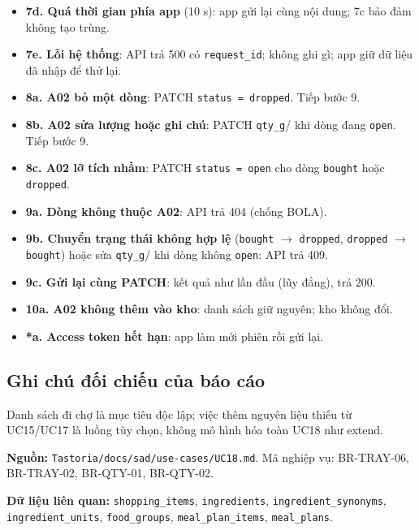 \begin{itemize}
\item \textbf{7d. Quá thời gian phía app} (10 s): app gửi lại cùng nội dung; 7c bảo đảm không tạo trùng.
\item \textbf{7e. Lỗi hệ thống}: API trả 500 có {\small\texttt{request\_\allowbreak{}\allowbreak{}id}}; không ghi gì; app giữ dữ liệu đã nhập để thử lại.
\item \textbf{8a. A02 bỏ một dòng}: PATCH {\small\texttt{status = dropped}}. Tiếp bước 9.
\item \textbf{8b. A02 sửa lượng hoặc ghi chú}: PATCH {\small\texttt{qty\_\allowbreak{}\allowbreak{}g}}/ khi dòng đang {\small\texttt{open}}. Tiếp bước 9.
\item \textbf{8c. A02 lỡ tích nhầm}: PATCH {\small\texttt{status = open}} cho dòng {\small\texttt{bought}} hoặc {\small\texttt{dropped}}.
\item \textbf{9a. Dòng không thuộc A02}: API trả 404 (chống BOLA).
\item \textbf{9b. Chuyển trạng thái không hợp lệ} ({\small\texttt{bought}} \ensuremath{\rightarrow} {\small\texttt{dropped}}, {\small\texttt{dropped}} \ensuremath{\rightarrow} {\small\texttt{bought}}) hoặc sửa {\small\texttt{qty\_\allowbreak{}\allowbreak{}g}}/ khi dòng không {\small\texttt{open}}: API trả 409.
\item \textbf{9c. Gửi lại cùng PATCH}: kết quả như lần đầu (lũy đẳng), trả 200.
\item \textbf{10a. A02 không thêm vào kho}: danh sách giữ nguyên; kho không đổi.
\item \textbf{*a. Access token hết hạn}: app làm mới phiên rồi gửi lại.
\end{itemize}
\subsection{Ghi chú đối chiếu của báo cáo}
Danh sách đi chợ là mục tiêu độc lập; việc thêm nguyên liệu thiếu từ UC15/\allowbreak{}UC17 là luồng tùy chọn, không mô hình hóa toàn UC18 như extend.

\textbf{Nguồn:} {\small\texttt{Tastoria/\allowbreak{}\allowbreak{}docs/\allowbreak{}\allowbreak{}sad/\allowbreak{}\allowbreak{}use-\allowbreak{}cases/\allowbreak{}\allowbreak{}UC18.\allowbreak{}md}}. Mã nghiệp vụ: BR-\allowbreak{}TRAY-\allowbreak{}06, BR-\allowbreak{}TRAY-\allowbreak{}02, BR-\allowbreak{}QTY-\allowbreak{}01, BR-\allowbreak{}QTY-\allowbreak{}02.

\textbf{Dữ liệu liên quan:} {\small\texttt{shopping\_\allowbreak{}\allowbreak{}items}}, {\small\texttt{ingredients}}, {\small\texttt{ingredient\_\allowbreak{}\allowbreak{}synonyms}}, {\small\texttt{ingredient\_\allowbreak{}\allowbreak{}units}}, {\small\texttt{food\_\allowbreak{}\allowbreak{}groups}}, {\small\texttt{meal\_\allowbreak{}\allowbreak{}plan\_\allowbreak{}\allowbreak{}items}}, {\small\texttt{meal\_\allowbreak{}\allowbreak{}plans}}.

